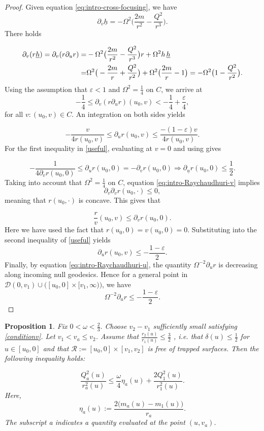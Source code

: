 \documentclass{article}[11pt]
\newcommand{\hsp}{\hspace{.5mm}}
\newcommand{\ubar}{\underline{u}}
\newcommand{\hba}{\underline{h}}
\newcommand{\be}{\begin{equation}}
\newcommand{\ee}{\end{equation}}
\newtheorem{proposition}{Proposition}[section]
\numberwithin{equation}{section}
\begin{document}
\begin{proof}
Given equation \eqref{eq:intro-cross-focusing}, we have \[  \partial_{v}\hba =- \Omega^2 \big(\frac{2m}{r^2}-\frac{Q^2}{r^3}\big).   \] There holds

\begin{align} \partial_{v}(r \hba) = \partial_{v}(r \partial_u r) \notag =& -\Omega^2\big(\frac{2m}{r^2}-\frac{Q^2}{r^3}\big) r + \Omega^2 h \hsp \hba \\ =& \Omega^2 \big(-\frac{2m}{r}+\frac{Q^2}{r^2}\big) + \Omega^2 \big(\frac{2m}{r}-1\big) = -\Omega^2 \big(1-\frac{Q^2}{r^2}\big).   \end{align} Using the assumption that $\varepsilon <1 $ and $\Omega^2 =\frac{1}{4}$ on $C$, we arrive at \be -\frac{1}{4}\leq \partial_{v}(r \partial_u r)(u_0,v) < -\frac{1}{4}+\frac{\varepsilon}{4}, \ee for all $v: (u_0,v) \in C$. An integration on both sides yields

\be -\frac{v}{4r(u_0,v)} \leq \partial_u r(u_0,v)\leq \frac{-(1-\varepsilon)v}{4r(u_0,v)}.  \label{useful}      \ee For the first inequality in \eqref{useful}, evaluating at $v=0$ and using  gives


\be -\frac{1}{4 \partial_{v}r(u_0,0)}\leq \partial_u r(u_0,0)= -\partial_{v}r(u_0,0) \Rightarrow \partial_{\ubar}r(u_0,0)\leq \frac{1}{2}. \ee Taking into account that $\Omega^2=\frac{1}{4}$ on $C$, equation \eqref{eq:intro-Raychaudhuri-v} implies \be \partial_{v}\partial_{v} r(u_0, \cdot) \leq 0,\ee meaning that $r(u_0,\cdot)$ is concave. This gives that

\be  \frac{r}{v}(u_0,v) \leq \partial_{v}r(u_0,0). \ee Here we have used the fact that $r(u_0,0)= v(u_0,0)=0$.  Substituting into the second inequality of \eqref{useful} yields 
 \be \partial_u r(u_0,v) \leq -\frac{1-\varepsilon}{2}. \ee Finally, by equation \eqref{eq:intro-Raychaudhuri-u}, the quantity $\Omega^{-2}\partial_u r$ is decreasing along incoming null geodesics. Hence for a general point in $\mathcal{D}(0,v_1)\cup\big([u_0,0]\times [v_1,\infty)\big)$, we have \[ \Omega^{-2}\partial_u r \leq - \frac{1-\varepsilon}{2}.   \]

\end{proof}


\begin{proposition}\label{propositionforQ}
Fix $0< \omega < \frac{2}{3}.$ Choose $v_2-v_1$ sufficiently small satisfying \eqref{conditionv}. Let $v_1< v_a \leq v_2$. Assume that $\frac{r_2(u)}{r_1(u)}\leq \frac{3}{2}$ , i.e. that $\delta(u) \leq \frac{1}{2}$ for $u \in [u_0,0]$ and that $\mathcal{R} := [u_0,0]\times [v_1,v_2]$ is free of trapped surfaces. Then the following inequality holds:

\[ \frac{Q_a^2(u)}{r_a^2(u)} \leq \frac{\omega}{4}\eta_a(u)+\frac{2 Q_1^2(u)}{r_1^2(u)}.     \]Here,  \[ \eta_a(u):= \frac{2\big(m_a(u)-m_1(u)\big)}{r_a} .  \]The subscript a indicates a quantity evaluated at the point $(u,v_a)$.
\end{proposition}
\end{document}

